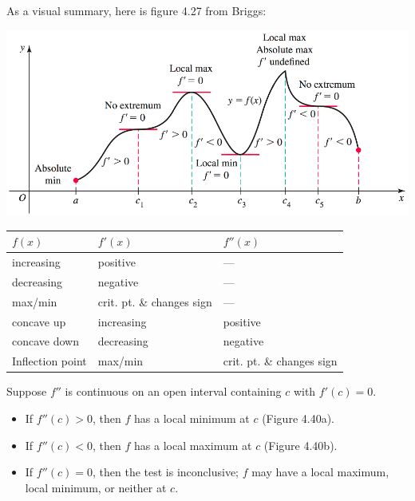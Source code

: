 \documentclass[../mathNotesPreamble]{subfiles}
\begin{document}
As a visual summary, here is figure 4.27 from Briggs:
\begin{center}
  \includegraphics[width=0.85\linewidth]{../images/briggs_04_03/fig4_27.png}
\end{center}
\begin{center}
  \begin{tabularx}{0.95\linewidth}{*{3}{X}}\toprule
    $f(x)$& $f'(x)$& $f''(x)$\\\midrule
    increasing& positive& ---\\
    decreasing& negative& ---\\
    max/min& crit. pt. \& changes sign& ---\\
    concave up& increasing& positive\\
    concave down& decreasing& negative\\
    Inflection point& max/min& crit. pt. \& changes sign\\\bottomrule
  \end{tabularx}
\end{center}
\pagebreak

\begin{thmBox*}
  Suppose $f''$ is continuous on an open interval containing $c$ with $f'(c)=0$.
  \begin{itemize}
    \item If $f''(c)>0$, then $f$ has a local minimum at $c$ (Figure 4.40a).
    \item If $f''(c)<0$, then $f$ has a local maximum at $c$  (Figure 4.40b).
    \item If $f''(c)=0$, then the test is inconclusive; $f$ may have a local maximum, local minimum, or neither at $c$.
  \end{itemize}
\end{thmBox*}
\end{document}
